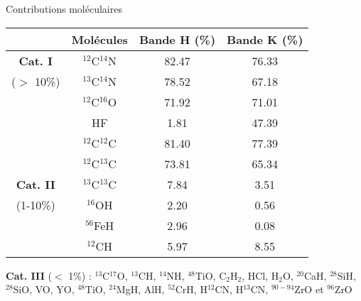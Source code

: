 \documentclass[10pt]{beamer}
\begin{document}
\begin{frame}[fragile]{Contributions moléculaires}
  
\begin{table}
    \begin{tabular}{c|ccc}
      \toprule
	\midrule
       &Molécules & Bande H (\%) & Bande K (\%)\\
      \midrule
      \cellcolor{green!15}\textbf{Cat. I}&\cellcolor{green!15}$^{12}$C$^{14}$N &\cellcolor{green!15} 82.47 & \cellcolor{green!15}76.33  \\
      \small\cellcolor{green!15}($>$ 10\%)&\cellcolor{green!15}$^{13}$C$^{14}$N & \cellcolor{green!15}78.52 & \cellcolor{green!15}67.18  \\
      \cellcolor{green!15}&\cellcolor{green!15}$^{12}$C$^{16}$O &\cellcolor{green!15}71.92 &\cellcolor{green!15}71.01   \\
      \cellcolor{green!15}&\cellcolor{green!15}HF & \cellcolor{green!15}1.81 &\cellcolor{green!15}47.39   \\
	  \cellcolor{green!15}&\cellcolor{green!15}$^{12}$C$^{12}$C &\cellcolor{green!15} 81.40 & \cellcolor{green!15}77.39  \\
	\cellcolor{green!15}&\cellcolor{green!15}$^{12}$C$^{13}$C & \cellcolor{green!15}73.81  & \cellcolor{green!15}65.34   \\
	\cellcolor{yellow!15}\textbf{Cat. II}&\cellcolor{yellow!15}$^{13}$C$^{13}$C &\cellcolor{yellow!15} 7.84  & \cellcolor{yellow!15}3.51  \\
	\small\cellcolor{yellow!15}(1-10\%)&\cellcolor{yellow!15}$^{16}$OH &\cellcolor{yellow!15}2.20  &\cellcolor{yellow!15}0.56    \\
	\cellcolor{yellow!15}&\cellcolor{yellow!15}$^{56}$FeH &\cellcolor{yellow!15} 2.96  &\cellcolor{yellow!15}0.08   \\
	\cellcolor{yellow!15}&\cellcolor{yellow!15}$^{12}$CH & \cellcolor{yellow!15}5.97  & \cellcolor{yellow!15}8.55   \\
      \bottomrule
    \end{tabular}
  \end{table}
\textbf{Cat. III} ($<$ 1\%) : $^{13}$C$^{17}$O, $^{13}$CH, $^{14}$NH, $^{48}$TiO, C$_{2}$H$_2$, HCl, H$_{2}$O, $^{20}$CaH, $^{28}$SiH, $^{28}$SiO, VO, YO, $^{48}$TiO, $^{24}$MgH, AlH, $^{52}$CrH, H$^{12}$CN, H$^{13}$CN, $^{90-94}$ZrO et $^{96}$ZrO
\end{frame}
\end{document}
